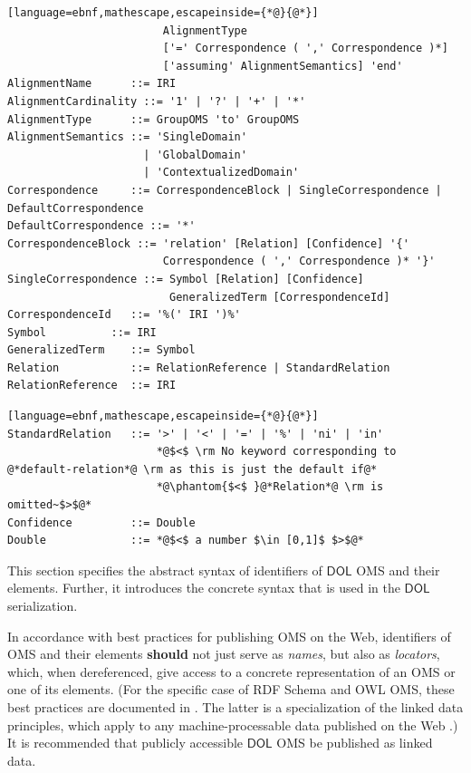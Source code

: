 \documentclass[10pt, a4paper]{isov2}
\makeatletter
\newcommand*\CommentAuthor{}
\renewcommand*\CommentAuthor{#1}}
\newcommand*\CommentDate{}
\renewcommand*\CommentDate{#1}}
\newcommand*\CommentId{}
\renewcommand*\CommentId{#1}}
\newcommand*\CommentType{}
\renewcommand*\CommentType{#1}}
\newcommand*{\SetCommentColorByType}[1]{%
\edef\localType{{#1}}%
\expandafter\ifstrequal\localType{q-aut}{\colorlet{CommentColor}{red}}{%
\expandafter\ifstrequal\localType{q-all}{\colorlet{CommentColor}{orange}}{%
\expandafter\ifstrequal\localType{todo}{\colorlet{CommentColor}{orange}}{%
\expandafter\ifstrequal\localType{fyi}{\colorlet{CommentColor}{lightgray}}{%
\colorlet{CommentColor}{yellow}}}}}}
\newcommand*{\SetCommentPrefixByType}[1]{%
\edef\localType{{#1}}%
\expandafter\@ifmtarg\localType{%
\edef\CommentPrefix{}%
}{%
\caseupper[q]{#1}%
\edef\CommentPrefix{\thestring: }%
}}
\newcommand*{\initComment}[1]{%
\setkeys{Comment}{#1}%
\SetCommentColorByType{\CommentType}%
\relax%
\SetCommentPrefixByType{\CommentType}%
\relax%
}
\newcommand*{\todonote}[2][]{%
\initComment{#1}%
\pdfcomment[author=\CommentAuthor,color=CommentColor,date=\CommentDate,id=\CommentId]{%
\CommentPrefix
#2}}
\renewcommand*{\todonote}[2][]{%
\initComment{#1}%
\ednote{\CommentPrefix #2}}
\newcommand*{\CLnote}[2][author=Christoph Lange]{%
\todonote[author=Christoph Lange,#1]{#2}}
\newcommand*{\should}{\textbf{should}\xspace}
\newcommand*{\DOL}{\ensuremath{\mathsf{DOL}}\xspace}
\makeatother
\begin{document}
\begin{lstlisting}[language=ebnf,mathescape,escapeinside={*@}{@*}]
                        AlignmentType
                        ['=' Correspondence ( ',' Correspondence )*]
                        ['assuming' AlignmentSemantics] 'end'
AlignmentName      ::= IRI
AlignmentCardinality ::= '1' | '?' | '+' | '*'
AlignmentType      ::= GroupOMS 'to' GroupOMS
AlignmentSemantics ::= 'SingleDomain'
                     | 'GlobalDomain'
                     | 'ContextualizedDomain'
Correspondence     ::= CorrespondenceBlock | SingleCorrespondence | DefaultCorrespondence
DefaultCorrespondence ::= '*' 
CorrespondenceBlock ::= 'relation' [Relation] [Confidence] '{'
                        Correspondence ( ',' Correspondence )* '}'
SingleCorrespondence ::= Symbol [Relation] [Confidence]
                         GeneralizedTerm [CorrespondenceId]
CorrespondenceId   ::= '%(' IRI ')%'
Symbol          ::= IRI
GeneralizedTerm    ::= Symbol
Relation           ::= RelationReference | StandardRelation
RelationReference  ::= IRI
\end{lstlisting}
\begin{lstlisting}[language=ebnf,mathescape,escapeinside={*@}{@*}]
StandardRelation   ::= '>' | '<' | '=' | '%' | 'ni' | 'in'
                       *@$<$ \rm No keyword corresponding to @*default-relation*@ \rm as this is just the default if@*
                       *@\phantom{$<$ }@*Relation*@ \rm is omitted~$>$@*
Confidence         ::= Double
Double             ::= *@$<$ a number $\in [0,1]$ $>$@*
\end{lstlisting}



\label{c:identifiers}
This section specifies the abstract syntax of identifiers of \DOL OMS and their elements. Further, 
it introduces the concrete syntax that is used in the \DOL serialization. 
\label{c:iris}


In accordance with best practices for publishing OMS on the Web, identifiers of OMS and their 
elements \should not just serve as \emph{names}, but also as \emph{locators}, which, when 
dereferenced, give access to a concrete representation of an OMS or one of its elements.  (For the 
specific case of RDF Schema and OWL OMS, these best practices are documented in 
\cite{W3C:NOTE-swbp-vocab-pub-20080828}.  The latter is a specialization of the linked data 
principles, which apply to any machine-processable data published on the Web 
\cite{BernersLee:LinkedData2006}.)  It is recommended that publicly accessible \DOL OMS be published 
as linked data.
\end{document}
